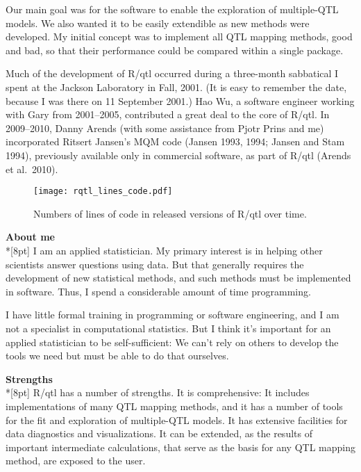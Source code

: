 \documentclass[letterpaper]{article}
\begin{document}
\begin{multicols}{2}
Our main goal was for the software to enable the exploration of
multiple-QTL models. We also wanted it to be easily extendible as new
methods were developed.  My initial concept was to implement all QTL
mapping methods, good and bad, so that their performance could be
compared within a single package.

Much of the development of R/qtl occurred during a three-month
sabbatical I spent at the Jackson Laboratory in Fall, 2001.  (It is
easy to remember the date, because I was there on 11 September 2001.)  Hao
Wu, a software engineer working with Gary from 2001--2005, contributed
a great deal to the core of R/qtl. In 2009--2010, Danny Arends (with
some assistance from Pjotr Prins and me) incorporated Ritsert Jansen's
MQM code (Jansen 1993, 1994; Jansen and Stam 1994), previously
available only in commercial software, as part of R/qtl (Arends et
al.\ 2010).




\begin{figure*}[tbh]
\begin{center}
\texttt{[image: rqtl\_lines\_code.pdf]}
\caption{Numbers of lines of code in released versions of R/qtl over
  time.}
\end{center}
\end{figure*}



\bigskip
{}
\noindent \textbf{\sffamily About me}\\*[8pt]
I am an applied statistician. My primary interest is in helping other
scientists answer questions using data. But that generally requires
the development of new statistical methods, and such methods must be
implemented in software.  Thus, I spend a considerable amount of time
programming.

I have little formal training in programming or software engineering,
and I am not a specialist in computational statistics.  But I think
it's important for an applied statistician to be self-sufficient: We
can't rely on others to develop the tools we need but must be able to
do that ourselves.



\bigskip
{}
\noindent \textbf{\sffamily Strengths}\\*[8pt]
R/qtl has a number of strengths. It is comprehensive: It includes
implementations of many QTL mapping methods, and it has a number of
tools for the fit and exploration of multiple-QTL models. It has
extensive facilities for data diagnostics and visualizations. It can
be extended, as the results of important intermediate calculations,
that serve as the basis for any QTL mapping method, are exposed to the
user.


\end{multicols}
\end{document}
